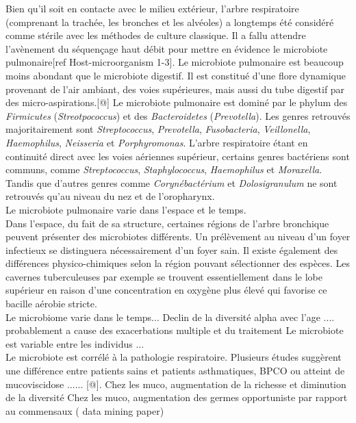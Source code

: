 \documentclass[12pt,a4paper]{article}
\begin{document}
Bien qu'il soit en contacte avec le milieu extérieur, l’arbre respiratoire (comprenant la trachée, les bronches et les alvéoles) a longtemps été considéré comme stérile avec les méthodes de culture classique. Il a fallu attendre l’avènement du séquençage haut débit pour mettre en évidence le microbiote pulmonaire[ref Host-microorganism 1-3].
Le microbiote pulmonaire est beaucoup moins abondant que le microbiote digestif. Il est constitué d’une flore dynamique provenant de l’air ambiant, des voies supérieures,  mais aussi du tube digestif par des micro-aspirations.[@]
Le microbiote pulmonaire est dominé par le phylum des \textit{Firmicutes} (\textit{Streotpococcus}) et des \textit{Bacteroidetes} (\textit{Prevotella}). Les genres retrouvés majoritairement sont \textit{Streptococcus}, \textit{Prevotella}, \textit{Fusobacteria}, \textit{Veillonella}, \textit{Haemophilus}, \textit{Neisseria} et \textit{Porphyromonas}.
L’arbre respiratoire étant en continuité direct avec les voies aériennes supérieur, certains genres bactériens sont communs, comme \textit{Streptococcus}, \textit{Staphylococcus}, \textit{Haemophilus} et \textit{Moraxella}. Tandis que d’autres genres comme \textit{Corynébactérium} et \textit{Dolosigranulum} ne sont retrouvés qu’au niveau du nez et de l'oropharynx. \\
Le microbiote pulmonaire varie dans l’espace et le temps. \\
Dans l’espace, du fait de sa structure, certaines régions de l'arbre bronchique peuvent présenter des microbiotes différents. Un prélèvement au niveau d'un foyer infectieux se distinguera nécessairement d'un foyer sain. Il existe également des différences physico-chimiques selon la région pouvant sélectionner des espèces. Les cavernes tuberculeuses par exemple se trouvent essentiellement dans le lobe supérieur en raison d'une concentration en oxygène plus élevé qui favorise ce bacille aérobie stricte. \\
Le microbiome varie dans le temps... 
Declin de la diversité alpha avec l'age .... probablement a cause des exacerbations multiple et du traitement
Le microbiote est variable entre les individus ... \\
Le microbiote est corrélé à la pathologie respiratoire. Plusieurs études suggèrent une différence entre patients sains et patients asthmatiques, BPCO ou atteint de mucoviscidose ...... [@].
Chez les muco, augmentation de la richesse et diminution de la diversité 
Chez les muco, augmentation des germes opportuniste par rapport au commensaux ( data mining paper)
\end{document}
